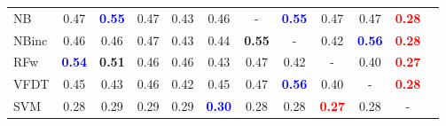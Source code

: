 \begin{table}[h]
\begin{center}
{\begin{tabular}{lcc|cc|cc|cc|cc|c}
NB	&   0.47 & \textcolor{blue}{\textbf{  0.55}} &   0.47 &   0.43 &   0.46 & - & \textcolor{blue}{\textbf{  0.55}} &   0.47 &   0.47 & \textcolor{red}{\textbf{  0.28}} \\
NBinc	&   0.46 &   0.46 &   0.47 &   0.43 &   0.44 & \textbf{  0.55} & - &   0.42 & \textcolor{blue}{\textbf{  0.56}} & \textcolor{red}{\textbf{  0.28}} \\ \hline
RFw	& \textcolor{blue}{\textbf{  0.54}} & \textbf{  0.51} &   0.46 &   0.46 &   0.43 &   0.47 &   0.42 & - &   0.40 & \textcolor{red}{\textbf{  0.27}} \\
VFDT	&   0.45 &   0.43 &   0.46 & 0.42  &   0.45 &   0.47 & \textcolor{blue}{\textbf{  0.56}} &   0.40 & - & \textcolor{red}{\textbf{  0.28}} \\ \hline
SVM	&   0.28 &   0.29 &   0.29 & 0.29 & \textcolor{blue}{\textbf{  0.30}} &   0.28 &   0.28 & \textcolor{red}{\textbf{  0.27}} &   0.28 & - \\\end{tabular}}\label{passiveDists}
\end{center}
\end{table}
